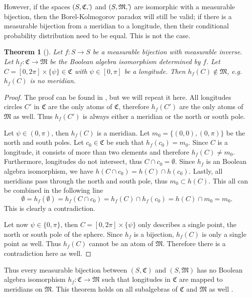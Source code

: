 \documentclass[twoside,a4paper]{article}
\theoremstyle{plain}
\newtheorem{theorem}{Theorem}[section]
\theoremstyle{definition}
\theoremstyle{remark}
\numberwithin{equation}{section}
\let\P\relax
\DeclareMathOperator{\P}{\mathbb{P}}
\DeclareMathOperator{\1}{\mathbbm{1}}
\begin{document}
However, if the spaces $(S, \mathfrak{C}, \bar{\P})$ and $(S, \mathfrak{M}, \hat{\P})$ are isomorphic with a measurable bijection, then the Borel-Kolmogorov paradox will still be valid; if there is a measurable bijection from a meridian to a longitude, then their conditional probability distribution need to be equal. This is not the case.
\begin{theorem}[\cite{Gyenis17}]
Let $f\colon S\to S$ be a measurable bijection with measurable inverse. Let $h_f\colon\mathfrak{C}\to\mathfrak{M}$ be the Boolean algebra isomorphism determined by $f$. Let $C=[0,2\pi]\times\{\psi\}\in\mathfrak{C}$ with $\psi\in[0,\pi]$ be a longitude. Then $h_f(C)\not\in\mathfrak{M}$, e.g.~$h_f(C)$ is no meridian.
\end{theorem}
\begin{proof}
The proof can be found in \cite{Gyenis17}, but we will repeat it here. All longitudes circles $C'$ in $\mathfrak{C}$ are the only atoms of $\mathfrak{C}$, therefore $h_f(C')$ are the only atoms of $\mathfrak{M}$ as well. Thus $h_f(C')$ is always either a meridian or the north or south pole.

Let $\psi\in(0,\pi)$, then $h_f(C)$ is a meridian. Let $m_0=\{(0,0), (0,\pi)\}$ be the north and south poles. Let $c_0\in\mathfrak{C}$ be such that $h_f(c_0)=m_0$. Since $C$ is a longitude, it consists of more than two elements and therefore $h_f(C)\neq m_0$. Furthermore, longitudes do not intersect, thus $C\cap c_0=\emptyset$. Since $h_f$ is an Boolean algebra isomorphism, we have $h(C\cap c_0)=h(C)\cap h(c_0)$. Lastly, all meridians pass through the north and south pole, thus $m_0\subset h(C)$. This all can be combined in the following line
\[\emptyset=h_f(\emptyset)=h_f(C\cap c_0)=h_f(C)\cap h_f(c_0)=h(C)\cap m_0=m_0.\]
This is clearly a contradiction.

Let now $\psi\in\{0,\pi\}$, then $C=[0,2\pi]\times\{\psi\}$ only describes a single point, the north or south pole of the sphere. Since $h_f$ is a bijection, $h_f(C)$ is only a single point as well. Thus $h_f(C)$ cannot be an atom of $\mathfrak{M}$. Therefore there is a contradiction here as well.
\end{proof}
Thus every measurable bijection between $(S,\mathfrak{C})$ and $(S,\mathfrak{M})$ has no Boolean algebra isomorphism $h_f\colon\mathfrak{C}\to\mathfrak{M}$ such that longitudes in $\mathfrak{C}$ are mapped to meridians on $\mathfrak{M}$. This theorem holds on all subalgebras of $\mathfrak{C}$ and $\mathfrak{M}$ as well \cite{Gyenis17}.
\end{document}
